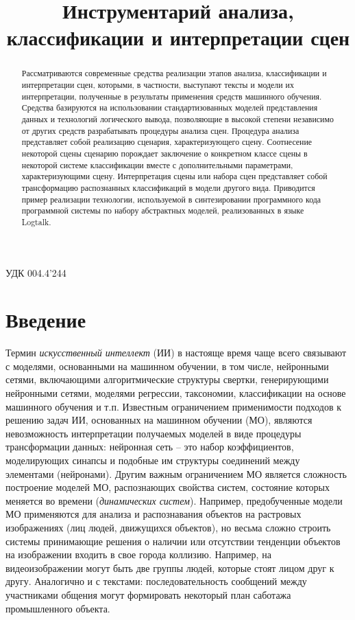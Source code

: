 \documentclass[12pt]{article}
\begin{document}
УДК 004.4'244

\title{Инструментарий анализа, классификации и интерпретации
сцен}

\maketitle

\begin{abstract}
  Рассматриваются современные средства реализации этапов анализа,
  классификации и интерпретации сцен, которыми, в частности, выступают
  тексты и модели их интерпретации, полученные в результаты применения
  средств машинного обучения. Средства базируются на использовании
  стандартизованных моделей представления данных и технологий логического
  вывода, позволяющие в высокой степени независимо от других средств
  разрабатывать процедуры анализа сцен. Процедура анализа представляет
  собой реализацию сценария, характеризующего сцену. Соотнесение некоторой
  сцены сценарию порождает заключение о конкретном классе сцены в
  некоторой системе классификации вместе с дополнительными параметрами,
  характеризующими сцену. Интерпретация сцены или набора сцен представляет
  собой трансформацию распознанных классификаций в модели другого вида.
  Приводится пример реализации технологии, используемой в синтезировании
  программного кода программной системы по набору абстрактных моделей,
  реализованных в языке Logtalk.
\end{abstract}

\section*{Введение}

Термин \emph{искусственный интеллект} (ИИ) в настояще время чаще всего
связывают с моделями, основанными на машинном обучении, в том числе,
нейронными сетями, включающими алгоритмические структуры свертки,
генерирующими нейронными сетями, моделями регрессии, таксономии,
классификации на основе машинного обучения и т.п. Известным ограничением
применимости подходов к решению задач ИИ, основанных на машинном
обучении (МО), являются невозможность интерпретации получаемых моделей в
виде процедуры трансформации данных: нейронная сеть -- это набор
коэффициентов, моделирующих синапсы и подобные им структуры соединений
между элементами (нейронами). Другим важным ограничением МО является
сложность построение моделей МО, распознающих свойства систем, состояние
которых меняется во времени (\emph{динамических систем}). Например,
предобученные модели МО применяются для анализа и распознавания объектов
на растровых изображениях (лиц людей, движущихся объектов), но весьма
сложно строить системы принимающие решения о наличии или отсутствии
тенденции объектов на изображении входить в свое города коллизию.
Например, на видеоизображении могут быть две группы людей, которые стоят
лицом друг к другу. Аналогично и с текстами: последовательность
сообщений между участниками общения могут формировать некоторый план
саботажа промышленного объекта.
\end{document}

